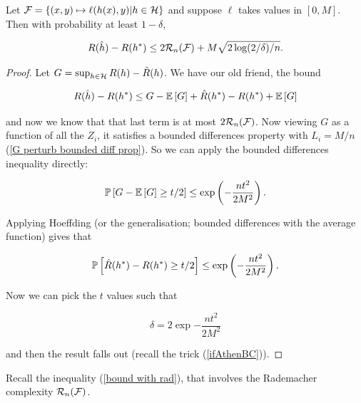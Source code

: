 \documentclass[11pt]{scrartcl}
\begin{document}
\begin{theorem}
\label{ERM with rademacher}
    Let $\F = \{ (x,y) \mapsto \ell(h(x),y) | h \in \H \}$ and suppose $\ell$ takes values in $[0,M]$. Then with probability at least $1-\delta$,
    
    \begin{equation}
        R(\hat{h}) - R(h^*) \le 2\R_n(\F) + M \sqrt{2 \log(2/\delta) / n}.
    \label{bound with rad}
    \end{equation}
    
    \begin{proof}
        Let $G = \sup_{h \in \H} R(h) - \hat{R}(h)$. We have our old friend, the bound
        
        \begin{equation}
            R(\hat{h}) - R(h^*) \le G - \E{G} + \hat{R}(h^*) - R(h^*) + \E{G}
        \end{equation}
        
        and now we know that that last term is at most $2\R_n(\F)$. Now viewing $G$ as a function of all the $Z_i$, it satisfies a bounded differences property with $L_i=M/n$ (\ref{G perturb bounded diff prop}). So we can apply the bounded differences inequality directly:
        
        \begin{equation}
            \P{G - \E{G} \ge t/2} \le \exp{- \frac{nt^2}{2M^2}}.
        \end{equation}
        
        Applying Hoeffding (or the generalisation; bounded differences with the average function) gives that
        
        \begin{equation}
            \P{\hat{R}(h^*) - R(h^*) \ge t/2} \le \exp{- \frac{nt^2}{2M^2}}.
        \end{equation}
        
        Now we can pick the $t$ values such that
        
        \begin{equation}
            \delta = 2 \exp{- \frac{nt^2}{2M^2}}
        \end{equation}
        
        and then the result falls out (recall the trick (\ref{ifAthenBC})).
        
    \end{proof}
\end{theorem}

Recall the inequality (\ref{bound with rad}), that involves the Rademacher complexity $\R_n(\F)$.
\end{document}
